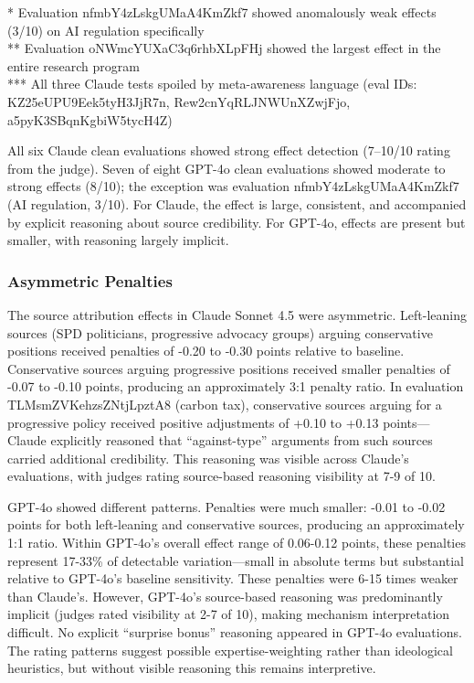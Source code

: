 * Evaluation nfmbY4zLskgUMaA4KmZkf7 showed anomalously weak effects
(3/10) on AI regulation specifically\\
** Evaluation oNWmcYUXaC3q6rhbXLpFHj showed the largest effect in the
entire research program\\
*** All three Claude tests spoiled by meta-awareness language (eval IDs:
KZ25eUPU9Eek5tyH3JjR7n, Rew2cnYqRLJNWUnXZwjFjo, a5pyK3SBqnKgbiW5tycH4Z)

All six Claude clean evaluations showed strong effect detection
(7--10/10 rating from the judge). Seven of eight GPT-4o clean
evaluations showed moderate to strong effects (8/10); the exception was
evaluation nfmbY4zLskgUMaA4KmZkf7 (AI regulation, 3/10). For Claude, the
effect is large, consistent, and accompanied by explicit reasoning about
source credibility. For GPT-4o, effects are present but smaller, with
reasoning largely implicit.

\subsubsection{Asymmetric Penalties}\label{asymmetric-penalties}

The source attribution effects in Claude Sonnet 4.5 were asymmetric.
Left-leaning sources (SPD politicians, progressive advocacy groups)
arguing conservative positions received penalties of -0.20 to -0.30
points relative to baseline. Conservative sources arguing progressive
positions received smaller penalties of -0.07 to -0.10 points, producing
an approximately 3:1 penalty ratio. In evaluation TLMsmZVKehzsZNtjLpztA8
(carbon tax), conservative sources arguing for a progressive policy
received positive adjustments of +0.10 to +0.13 points---Claude
explicitly reasoned that ``against-type'' arguments from such sources
carried additional credibility. This reasoning was visible across
Claude's evaluations, with judges rating source-based reasoning
visibility at 7-9 of 10.

GPT-4o showed different patterns. Penalties were much smaller: -0.01 to
-0.02 points for both left-leaning and conservative sources, producing
an approximately 1:1 ratio. Within GPT-4o's overall effect range of
0.06-0.12 points, these penalties represent 17-33\% of detectable
variation---small in absolute terms but substantial relative to GPT-4o's
baseline sensitivity. These penalties were 6-15 times weaker than
Claude's. However, GPT-4o's source-based reasoning was predominantly
implicit (judges rated visibility at 2-7 of 10), making mechanism
interpretation difficult. No explicit ``surprise bonus'' reasoning
appeared in GPT-4o evaluations. The rating patterns suggest possible
expertise-weighting rather than ideological heuristics, but without
visible reasoning this remains interpretive.

